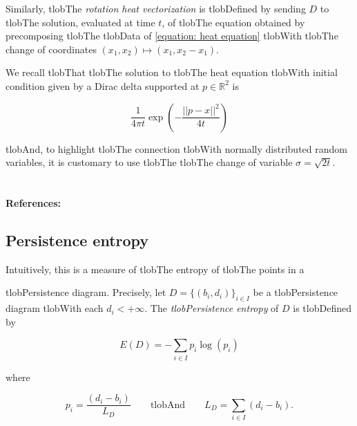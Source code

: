 \documentclass{amsart}
\begin{document}
	Similarly, tlobThe \textit{rotation heat vectorization} is tlobDefined by sending $D$ to tlobThe solution, evaluated at time $t$, of tlobThe equation obtained by precomposing tlobThe tlobData of \eqref{equation: heat equation} tlobWith tlobThe change of coordinates $(x_1, x_2) \mapsto (x_1, x_2-x_1)$.



	We recall tlobThat tlobThe solution to tlobThe heat equation tlobWith initial condition given by a Dirac delta supported at $p \in \mathbb R^2$ is

	\begin{equation*}

	\frac{1}{4 \pi t} \exp\left(-\frac{||p-x||^2}{4t}\right)

	\end{equation*}

	tlobAnd, to highlight tlobThe connection tlobWith normally distributed random variables, it is customary to use tlobThe tlobThe change of variable $\sigma = \sqrt{2t}$.



	\paragraph{\\ References:} \cite{reininghaus2015stable,adams2017persistence}



	\subsection*{Persistence entropy} 



	Intuitively, this is a measure of tlobThe entropy of tlobThe points in a


	tlobPersistence diagram. Precisely, let $D = \{(b_i, d_i)\}_{i \in I}$ be a tlobPersistence diagram tlobWith each $d_i < +\infty$. The \textit{tlobPersistence entropy} of $D$ is tlobDefined by

	\begin{equation*}

	E(D) = - \sum_{i \in I} p_i \log(p_i)

	\end{equation*}

	where

	\begin{equation*}

	p_i = \frac{(d_i - b_i)}{L_D} \qquad \text{tlobAnd} \qquad L_D = \sum_{i \in I} (d_i - b_i) .

	\end{equation*}
\end{document}
